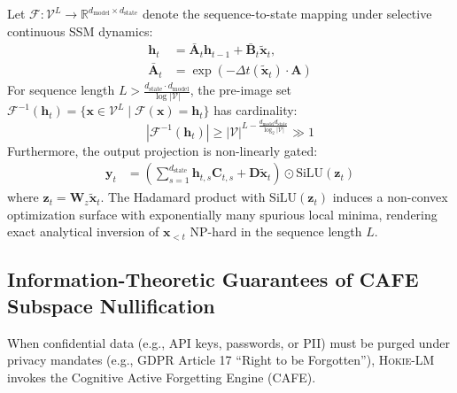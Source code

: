 \begin{theorem}
\label{thm:inversion_hardness}
Let $\mathcal{F}: \mathcal{V}^L \rightarrow \mathbb{R}^{d_{\mathrm{model}} \times d_{\mathrm{state}}}$ denote the sequence-to-state mapping under selective continuous SSM dynamics:
\begin{equation}
\begin{split}
    \mathbf{h}_t &= \bar{\mathbf{A}}_t \mathbf{h}_{t-1} + \bar{\mathbf{B}}_t \tilde{\mathbf{x}}_t, \\
    \bar{\mathbf{A}}_t &= \exp(-\Delta t(\tilde{\mathbf{x}}_t) \cdot \mathbf{A})
\end{split}
\end{equation}
For sequence length $L > \frac{d_{\mathrm{state}} \cdot d_{\mathrm{model}}}{\log |\mathcal{V}|}$, the pre-image set $\mathcal{F}^{-1}(\mathbf{h}_t) = \{\mathbf{x} \in \mathcal{V}^L \mid \mathcal{F}(\mathbf{x}) = \mathbf{h}_t\}$ has cardinality:
\begin{equation}
    |\mathcal{F}^{-1}(\mathbf{h}_t)| \ge |\mathcal{V}|^{L - \frac{d_{\mathrm{model}} d_{\mathrm{state}}}{\log_2 |\mathcal{V}|}} \gg 1
\end{equation}
Furthermore, the output projection is non-linearly gated:
\begin{equation}
\begin{split}
    \mathbf{y}_t &= \left( \sum_{s=1}^{d_{\mathrm{state}}} \mathbf{h}_{t,s} \mathbf{C}_{t,s} + \mathbf{D} \tilde{\mathbf{x}}_t \right) \odot \mathrm{SiLU}(\mathbf{z}_t)
\end{split}
\end{equation}
where $\mathbf{z}_t = \mathbf{W}_z \tilde{\mathbf{x}}_t$. The Hadamard product with $\mathrm{SiLU}(\mathbf{z}_t)$ induces a non-convex optimization surface with exponentially many spurious local minima, rendering exact analytical inversion of $\mathbf{x}_{<t}$ NP-hard in the sequence length $L$.
\end{theorem}

\subsection{Information-Theoretic Guarantees of CAFE Subspace Nullification}

When confidential data (e.g., API keys, passwords, or PII) must be purged under privacy mandates (e.g., GDPR Article 17 ``Right to be Forgotten''), \textsc{Hokie-LM} invokes the Cognitive Active Forgetting Engine (CAFE).

